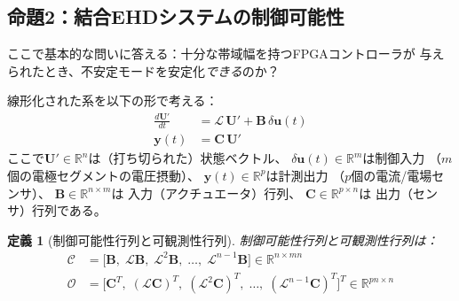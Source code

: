 \documentclass[12pt,twocolumn]{ltjsarticle}
\newtheorem{definition}{定義}
\newcommand{\uu}{\mathbf{U}}
\newcommand{\Lop}{\mathcal{L}}
\begin{document}
\subsection{命題2：結合EHDシステムの制御可能性}
\label{sec:stability:control}

ここで基本的な問いに答える：十分な帯域幅を持つFPGAコントローラが
与えられたとき、不安定モードを安定化\emph{できる}のか？

線形化された系を以下の形で考える：
\begin{align}
  \frac{d\uu'}{dt} &= \Lop\,\uu' + \mathbf{B}\,\delta\bm{u}(t)
  \label{eq:state_eq} \\
  \bm{y}(t) &= \mathbf{C}\,\uu'
  \label{eq:output_eq}
\end{align}
ここで$\uu' \in \mathbb{R}^n$は（打ち切られた）状態ベクトル、
$\delta\bm{u}(t) \in \mathbb{R}^m$は制御入力
（$m$個の電極セグメントの電圧摂動）、
$\bm{y}(t) \in \mathbb{R}^p$は計測出力
（$p$個の電流/電場センサ）、
$\mathbf{B} \in \mathbb{R}^{n \times m}$は
入力（アクチュエータ）行列、
$\mathbf{C} \in \mathbb{R}^{p \times n}$は
出力（センサ）行列である。

\begin{definition}[制御可能性行列と可観測性行列]
\label{def:kalman}
制御可能性行列と可観測性行列は：
\begin{align}
  \mathcal{C} &= \bigl[\mathbf{B},\; \Lop\mathbf{B},\;
    \Lop^2\mathbf{B},\; \ldots,\; \Lop^{n-1}\mathbf{B}\bigr]
    \in \mathbb{R}^{n \times mn}
    \label{eq:controllability_matrix} \\
  \mathcal{O} &= \bigl[\mathbf{C}^T,\;
    (\Lop\mathbf{C})^T,\; (\Lop^2\mathbf{C})^T,\;
    \ldots,\; (\Lop^{n-1}\mathbf{C})^T\bigr]^T
    \in \mathbb{R}^{pn \times n}
    \label{eq:observability_matrix}
\end{align}
\end{definition}
\end{document}

